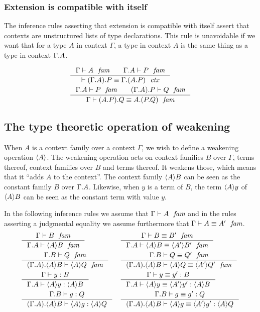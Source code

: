 \subsubsection{Extension is compatible with itself}\label{comp-ee}
The inference rules asserting that extension is compatible with itself assert
that contexts are unstructured lists of type declarations. This rule is
unavoidable if we want that for a type $A$ in context $\Gamma$, a type
in context $A$ is the same thing as a type in context $\ctxext{\Gamma}{A}$. 

\begin{align}
& \inference{\jfam{\Gamma}{A}\qquad\jfam{\ctxext{\Gamma}{A}}{P}}
  {\jctxeq{\ctxext{{\Gamma}{A}}{P}}{\ctxext{\Gamma}{{A}{P}}}}\\
& \inference{\jfam{\ctxext{\Gamma}{A}}{P}\qquad\jfam{\ctxext{{\Gamma}{A}}{P}}{Q}}
  {\jfameq{\Gamma}{\ctxext{{A}{P}}{Q}}{\ctxext{A}{{P}{Q}}}}
\end{align}

\subsection{The type theoretic operation of weakening}
When $A$ is a context family over a context $\Gamma$, we wish to define a weakening
operation $\ctxwk{A}{}$. The weakening operation acts on context families $B$ 
over $\Gamma$, terms thereof, context families over $B$ and terms thereof.
It weakens those, which means that it ``adds $A$ to the context''. The context
family $\ctxwk{A}{B}$ can be seen as the constant family $B$ over $\ctxext{\Gamma}{A}$.
Likewise, when $y$ is a term of $B$, the term $\ctxwk{A}{y}$ of $\ctxwk{A}{B}$
can be seen as the constant term with value $y$.
 
 In the following inference rules we assume that $\jfam{\Gamma}{A}$ and in the
 rules asserting a judgmental equality we assume furthermore that 
 $\jfameq{\Gamma}{A}{A'}$.
\begin{align}
& \inference{\jfam{\Gamma}{B}}{\jfam{\ctxext{\Gamma}{A}}{\ctxwk{A}{B}}}
& & \inference{\jfameq{\Gamma}{B}{B'}}{\jfameq{\ctxext{\Gamma}{A}}{\ctxwk{A}{B}}{\ctxwk{A'}{B'}}}\\
& \inference{\jfam{\ctxext{\Gamma}{B}}{Q}}
{\jfam{\ctxext{{\Gamma}{A}}{\ctxwk{A}{B}}}{\ctxwk{A}{Q}}}
& & \inference{\jfameq{\ctxext{\Gamma}{B}}{Q}{Q'}}
{\jfameq{\ctxext{{\Gamma}{A}}{\ctxwk{A}{B}}}{\ctxwk{A}{Q}}{\ctxwk{A'}{Q'}}}\\
& \inference{\jterm{\Gamma}{B}{y}}{\jterm{\ctxext{\Gamma}{A}}{\ctxwk{A}{B}}{\ctxwk{A}{y}}}
& & \inference{\jtermeq{\Gamma}{B}{y}{y'}}{\jtermeq{\ctxext{\Gamma}{A}}{\ctxwk{A}{B}}{\ctxwk{A}{y}}{\ctxwk{A'}{y'}}}\\
& \inference{\jterm{\ctxext{\Gamma}{B}}{Q}{g}}{\jterm{\ctxext{{\Gamma}{A}}{\ctxwk{A}{B}}}{\ctxwk{A}{Q}}{\ctxwk{A}{g}}}
& & \inference{\jtermeq{\ctxext{\Gamma}{B}}{Q}{g}{g'}}
{\jtermeq{\ctxext{{\Gamma}{A}}{\ctxwk{A}{B}}}{\ctxwk{A}{Q}}{\ctxwk{A}{g}}{\ctxwk{A'}{g'}}}
\end{align}

